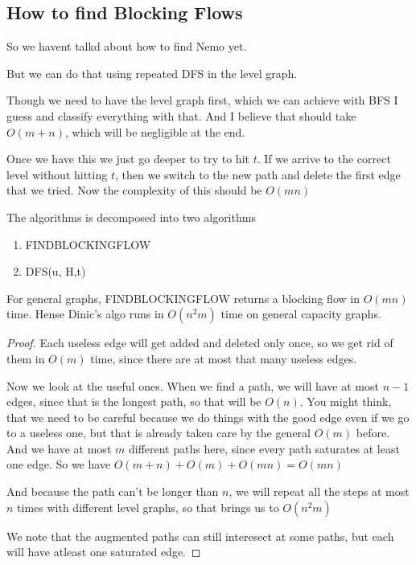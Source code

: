 \subsection{How to find Blocking Flows}

So we havent talkd about how to find Nemo yet.

But we can do that using repeated DFS in the level graph.

Though we need to have the level graph first, which we can achieve with BFS I guess and classify everything with that. And I believe that should take $O(m+n)$, which will be negligible at the end.

Once we have this we just go deeper to try to hit $t$. If we arrive to the correct level without hitting $t$, then we switch to the new path and delete the first edge that we tried. Now the complexity of this should be $O(mn)$

The algorithms is decomposed into two algorithms

\begin{enumerate}
    \item FINDBLOCKINGFLOW
    \item DFS(u, H,t)
\end{enumerate}



\begin{lema}
    For general graphs, FINDBLOCKINGFLOW returns a blocking flow in $O(mn)$ time. Hense Dinic's algo runs in $O(n^2m)$ time on general capacity graphs.
\end{lema}

\begin{proof}
    Each useless edge will get added and deleted only once, so we get rid of them in $O(m)$ time, since there are at most that many useless edges.

    Now we look at the useful ones. When we find a path, we will have at most $n-1$ edges, since that is the longest path, so that will be $O(n)$. You might think, that we need to be careful because we do things with the good edge even if we go to a useless one, but that is already taken care by the general $O(m)$ before. And we have at most $m$ different paths here, since every path saturates at least one edge. So we have $O(m+n) + O(m) + O(mn) = O(mn)$

    And because the path can't be longer than $n$, we will repeat all the steps at most $n$ times with different level graphs, so that brings us to $O(n^2m)$

    We note that the augmented paths can still interesect at some paths, but each will have atleast one saturated edge.
\end{proof}

